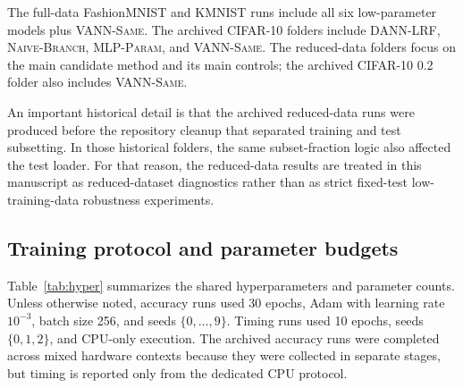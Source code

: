 \documentclass[preprint,12pt]{elsarticle}
\newcommand{\DANNLRF}{\textsc{DANN-LRF}}
\newcommand{\NAIVEBRANCH}{\textsc{Naive-Branch}}
\newcommand{\MLPPARAM}{\textsc{MLP-Param}}
\newcommand{\VANNSAME}{\textsc{VANN-Same}}
\begin{document}
The full-data FashionMNIST and KMNIST runs include all six low-parameter models plus \VANNSAME{}. The archived CIFAR-10 folders include \DANNLRF{}, \NAIVEBRANCH{}, \MLPPARAM{}, and \VANNSAME{}. The reduced-data folders focus on the main candidate method and its main controls; the archived CIFAR-10 0.2 folder also includes \VANNSAME{}.

An important historical detail is that the archived reduced-data runs were produced before the repository cleanup that separated training and test subsetting. In those historical folders, the same subset-fraction logic also affected the test loader. For that reason, the reduced-data results are treated in this manuscript as reduced-dataset diagnostics rather than as strict fixed-test low-training-data robustness experiments.

\subsection{Training protocol and parameter budgets}
\label{sec:protocol}

Table~\ref{tab:hyper} summarizes the shared hyperparameters and parameter counts. Unless otherwise noted, accuracy runs used 30 epochs, Adam \cite{kingma2015adam} with learning rate $10^{-3}$, batch size 256, and seeds $\{0,\dots,9\}$. Timing runs used 10 epochs, seeds $\{0,1,2\}$, and CPU-only execution. The archived accuracy runs were completed across mixed hardware contexts because they were collected in separate stages, but timing is reported only from the dedicated CPU protocol.
\end{document}

